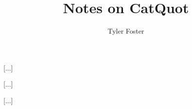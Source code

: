 \documentclass[11pt, a4paper]{article}
\begin{document}
\title{Notes on CatQuot}

\author{Tyler Foster}

\maketitle

\begin{section}{[...]}

\begin{subsection}{[...]}




[...]
\end{subsection}

\end{section}

\cite{NeoRie}
\cite{Geo}
\cite{Cohn}




\end{document}
